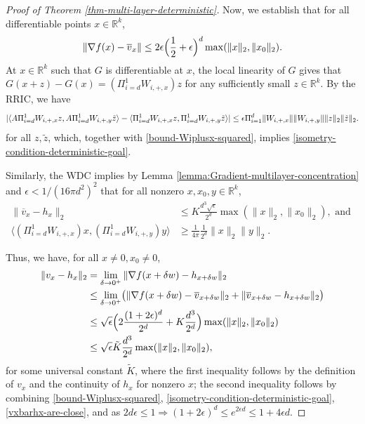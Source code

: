 \documentclass[11pt]{article}
\newcommand{\R}{\mathbb{R}}
\newcommand{\eps}{\epsilon}
\newcommand{\ztilde}{\tilde{z}}
\newcommand{\red}[1]{{\color{black} #1}}
\newcommand{\xo}{x_0}
\newcommand{\Pioned}{\Pi_{i=1}^d}
\newcommand{\PiWd}{\Pi_{i=d}^1 W_{i,+,x}}
\newcommand{\PiWdy}{\Pi_{i=d}^1 W_{i,+,y}}
\newcommand{\Wipx}{W_{i, +, x}}
\newcommand{\Wipy}{W_{i, +, y}}
\newcommand{\Wipxo}{W_{i, +, \xo}}
\newcommand{\vx}{v_{x}}
\newcommand{\vbarx}{\overline{v}_{x}}
\newcommand{\vbar}{\overline{v}}
\newcommand{\hx}{h_x}
\newcommand{\Ktilde}{\tilde{K}}
\begin{document}
\begin{proof}[Proof of Theorem \ref{thm-multi-layer-deterministic}]
Now, we establish that for all differentiable points $x \in \R^k$,
\begin{align}
\| \nabla f(x) - \vbarx  \| \leq 2 \eps \Bigl(\frac{1}{2} + \eps \Bigr)^d  \max(\|x\|_2, \|\xo\|_2). \label{isometry-condition-deterministic-goal}
\end{align}
At $x \in \R^k$ such that $G$ is differentiable at $x$, the local linearity of $G$ gives that $G(x+z) - G(x) = (\PiWd) z$ for any sufficiently small $z \in \R^k$.   By the RRIC, we have 
\begin{align}
| \langle \red{A} \PiWd z, \red{A} \PiWdy \ztilde \rangle  - \langle  \PiWd z,  \PiWdy \ztilde \rangle | \leq \eps \Pioned \| \Wipx\| \|\Wipy\| \|z\|_2 \|\ztilde\|_2. \label{RRIC-application}
\end{align}
for all $z, \ztilde$, which, together with \eqref{bound-Wiplusx-squared}, implies \eqref{isometry-condition-deterministic-goal}.




Similarly, the WDC implies by Lemma \ref{lemma:Gradient-multilayer-concentration} and $\eps < 1/(16 \pi d^2)^2$ that for all nonzero $x, \xo, y \in \R^k$, 
\begin{align}
\| \vbarx - \hx \|_2 &\leq K \frac{d^3 \sqrt{\eps}}{2^d} \max ( \|x\|_2, \| \xo\|_2), \text{ and } \label{vxbarhx-are-close}\\
\bigl \langle  (\PiWd) x, ( \PiWdy) y \bigr \rangle  &\geq \frac{1}{4 \pi} \frac{1}{2^d} \|x\|_2 \|y\|_2. \label{piwipxxpiwipyy}
\end{align}

Thus, we have, for all $x\neq 0, \xo \neq 0$, 
\begin{align}
\|\vx - \hx\|_2  &=\lim_{\delta \to 0^+} \|  \nabla  f(x + \delta w) - h_{x + \delta w}  \|_2 \notag \\
& \leq \lim_{\delta \to 0^+}  \bigl( \|\nabla f(x + \delta w)- \vbar_{x + \delta w}\|_2 + \|\vbar_{x + \delta w} - h_{x + \delta w}\|_2 \bigr) \notag\\
&\leq \sqrt{\eps} \Bigl(2 \frac{(1+2 \eps)^d}{2^d} + K \frac{d^3}{2^d} \Bigr) \max(\|x\|_2, \|\xo\|_2) \notag \\
&\leq \sqrt{\eps} \Ktilde \frac{d^3}{2^d}  \max(\|x\|_2, \|\xo\|_2), \label{vxgx-approx-highd}
\end{align}
for some universal constant $\Ktilde$, where the first inequality follows by the definition of $\vx$ and the continuity of $\hx$ for nonzero $x$; the second inequality follows by combining \eqref{bound-Wiplusx-squared}, \eqref{isometry-condition-deterministic-goal},  \eqref{vxbarhx-are-close},  and as $2 d \eps \leq 1 \Rightarrow (1+2 \eps)^d \leq e^{2 \eps d} \leq 1 + 4\eps d$.


\end{proof}
\end{document}
